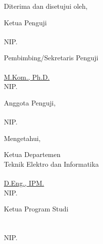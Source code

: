 \begin{center}
    Diterima dan disetujui oleh,
\end{center}
  \begin{minipage}{0.45\textwidth}
    Ketua Penguji\\[1.5cm]\underline{\ketuapenguji}\\
    NIP. \NIPketuapenguji
\end{minipage}
\hfill
\begin{minipage}{0.45\textwidth}
    Pembimbing/Sekretaris Penguji\\[1.5cm]
    \underline{\pembimbing}\\
    \underline{M.Kom., Ph.D.}\\
    NIP. \NIPpembimbing
\end{minipage}%
\begin{center}
    \centering
    \begin{minipage}{0.45\textwidth}
    Anggota Penguji,\\[1.5cm]
    \underline{\anggotapenguji}\\
    NIP. \NIPanggotapenguji
\end{minipage}%
\end{center}
\begin{center}
    Mengetahui,
\end{center}
\begin{minipage}{0.5\textwidth}
	Ketua Departemen\\
	Teknik Elektro dan Informatika\\[1.75cm]
	\underline{\koordepartemen}\\
	\underline{D.Eng., IPM.}\\
	NIP. \NIPkadep
\end{minipage}
\hfill
\begin{minipage}{0.45\textwidth}
    Ketua Program Studi\\
    \prodi\\[1.75cm]
    \underline{\koorprodi}\\
    NIP. \NIPKaprodi
\end{minipage}%